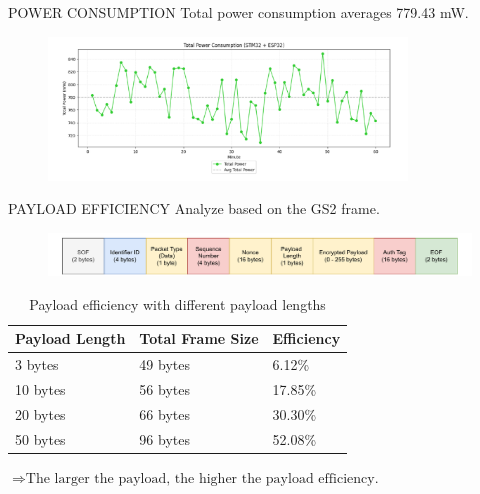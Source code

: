 \begin{frame}{POWER CONSUMPTION}
	Total power consumption averages 779.43 mW.
	\vspace{-0.2cm}
	\begin{figure}
		\centering
		\includegraphics[width=0.85\textwidth]{pic/power.pdf}
	\end{figure}
\end{frame}


\begin{frame}{PAYLOAD EFFICIENCY}
	Analyze based on the GS2 frame.
	\begin{figure}
		\centering
		\includegraphics[width=1\textwidth]{pic/gs2.pdf}
	\end{figure}
	\vspace{-0.5cm}
	\begin{table}[h]
	\centering
	\small
	\caption{Payload efficiency with different payload lengths}
	\label{tab:efficiency}
	\begin{tabular}{|p{4cm}|p{5cm}|p{3cm}|}
	\hline
	Payload Length & Total Frame Size & Efficiency \\
	\hline
	3 bytes   & 49 bytes  & 6.12\%  \\
	10 bytes  & 56 bytes & 17.85\% \\
	20 bytes  & 66 bytes & 30.30\% \\
	50 bytes  & 96 bytes & 52.08\% \\
	\hline
	\end{tabular}
	\end{table}
	$\Rightarrow \text{The larger the payload, the higher the payload efficiency.}$
\end{frame}